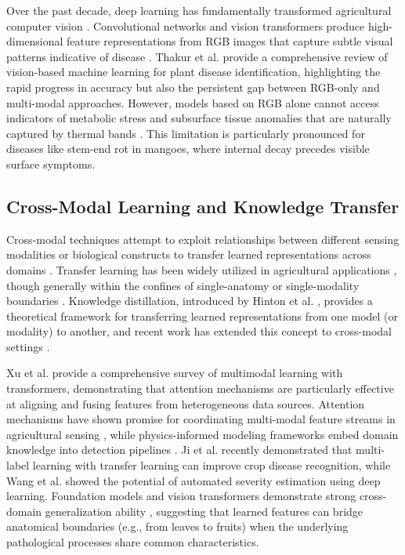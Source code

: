 \documentclass[utf8]{FrontiersinHarvard} %
\begin{document}
Over the past decade, deep learning has fundamentally transformed agricultural computer vision \cite{kamilaris2018,coulibaly2022}. Convolutional networks and vision transformers produce high-dimensional feature representations from RGB images that capture subtle visual patterns indicative of disease \cite{dosovitskiy2021,liu2022convnext}. Thakur et al. \cite{thakur2022} provide a comprehensive review of vision-based machine learning for plant disease identification, highlighting the rapid progress in accuracy but also the persistent gap between RGB-only and multi-modal approaches. However, models based on RGB alone cannot access indicators of metabolic stress and subsurface tissue anomalies that are naturally captured by thermal bands \cite{lu2020,pineda2021}. This limitation is particularly pronounced for diseases like stem-end rot in mangoes, where internal decay precedes visible surface symptoms.

\subsection{Cross-Modal Learning and Knowledge Transfer}
Cross-modal techniques attempt to exploit relationships between different sensing modalities or biological constructs to transfer learned representations across domains \cite{zhuang2020}. Transfer learning has been widely utilized in agricultural applications \cite{chen2020_transfer,tan2018}, though generally within the confines of single-anatomy or single-modality boundaries \cite{barbedo2019}. Knowledge distillation, introduced by Hinton et al. \cite{hinton2015}, provides a theoretical framework for transferring learned representations from one model (or modality) to another, and recent work has extended this concept to cross-modal settings \cite{li2023_kd}.

Xu et al. \cite{xu2023} provide a comprehensive survey of multimodal learning with transformers, demonstrating that attention mechanisms are particularly effective at aligning and fusing features from heterogeneous data sources. Attention mechanisms have shown promise for coordinating multi-modal feature streams in agricultural sensing \cite{niu2021,guo2022}, while physics-informed modeling frameworks embed domain knowledge into detection pipelines \cite{karniadakis2021}. Ji et al. \cite{ji2023} recently demonstrated that multi-label learning with transfer learning can improve crop disease recognition, while Wang et al. \cite{wang2022_synthetic} showed the potential of automated severity estimation using deep learning. Foundation models and vision transformers demonstrate strong cross-domain generalization ability \cite{vaswani2017,dosovitskiy2021}, suggesting that learned features can bridge anatomical boundaries (e.g., from leaves to fruits) when the underlying pathological processes share common characteristics.
\end{document}

